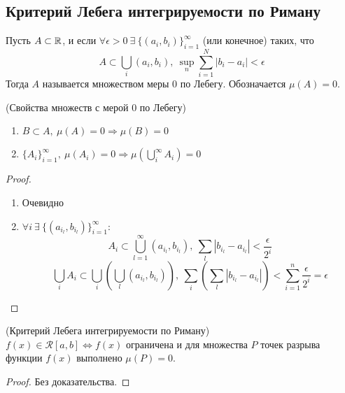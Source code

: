 \subsection{Критерий Лебега интегрируемости по Риману}
\begin{definition}
    Пусть $A\subset \mathbb{R}$, и если $\forall \epsilon>0\ \exists\ \{(a_i,b_i)\}_{i=1}^{\infty}$ (или конечное) таких, что 
    \[A\subset \bigcup\limits_i(a_i,b_i),\ \sup\limits_n \sum\limits_{i=1}^{N}|b_i-a_i|< \epsilon\]
    Тогда $A$ называется множеством меры 0 по Лебегу. Обозначается $\mu(A)=0$.
\end{definition} 
\begin{theorem} (Свойства множеств с мерой 0 по Лебегу)
    \begin{enumerate}
        \item $B\subset A,\ \mu(A)=0 \Rightarrow \mu(B)=0$
        \item $\{A_i\}_{i=1}^{\infty},\ \mu(A_i)=0 \Rightarrow \mu(\bigcup\limits_i^{\infty} A_i)=0$
    \end{enumerate}
\end{theorem} 
\begin{proof} \
    \begin{enumerate}
        \item Очевидно
        \item $\forall i\ \exists\ \{(a_{i_l},b_{i_l})\}_{i=1}^{\infty}:$
        \[A_i\subset \bigcup\limits_{l=1}^{\infty} (a_{i_l},b_{i_l}),\ \sum\limits_{l} |b_{i_l}-a_{i_l}|<\frac{\epsilon}{2^i}\]
        \[\bigcup\limits_i A_i \subset \bigcup\limits_i\left(\bigcup\limits_l (a_{i_l},b_{i_l})\right),\ \sum\limits_{i}\left(\sum\limits_{l} |b_{i_l}-a_{i_l}|\right)<\sum\limits_{i=1}^{n}\frac{\epsilon}{2^i}=\epsilon\]
    \end{enumerate}
\end{proof} 
\begin{theorem} (Критерий Лебега интегрируемости по Риману)\\
    $f(x)\in \mathcal{R}[a,b] \Leftrightarrow f(x)$ ограничена и для множества $P$ точек разрыва функции $f(x)$ выполнено $\mu(P)=0$.
\end{theorem} 
\begin{proof}
    Без доказательства.
\end{proof} 
